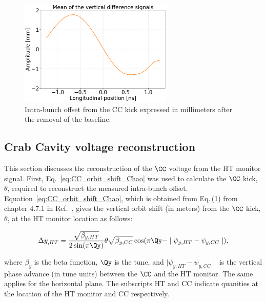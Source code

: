 \begin{figure}[!h]
   \centering         
   \includegraphics[width=0.65\textwidth]{images/Ch4/HT_corrected__20180530_135105_baseline_correction_new_version_CC_post_processing.png}
       \caption{Intra-bunch offset from the CC kick expressed in millimeters after the removal of the baseline.}
       \label{fig:HT_baseline_correction_crabbing_mm}
\end{figure}


 \subsection{Crab Cavity voltage reconstruction}\label{sec:Vcc_calibration}
 This section discusses the reconstruction of the $\CC$ voltage from the HT monitor signal. First, Eq.~\eqref{eq:CC_orbit_shift_Chao} was used to calculate the $\CC$ kick, $\theta$, required to reconstruct the measured intra-bunch offset. Equation~\eqref{eq:CC_orbit_shift_Chao}, which is obtained from Eq.\,(1) from chapter 4.7.1 in Ref.~\cite{Chao:1490001}, gives the vertical orbit shift (in meters) from the $\CC$ kick, $\theta$, at the HT monitor location as follows:

\begin{equation}\label{eq:CC_orbit_shift_Chao}
   \Delta y_{,HT} = \frac{\sqrt{\beta_{y, HT}}}{2 \sin(\pi \Qy)} \theta \sqrt{\beta_{y, CC}} \cos(\pi \Qy - \mid \psi_{y, HT} - \psi_{y, CC} \mid),
\end{equation}

where $\beta_y$ is the beta function, $\Qy$ is the tune, and $\mid \psi_{y, HT} - \psi_{y, CC} \mid$ is the vertical phase advance (in tune units) between the $\CC$ and the HT monitor. The same applies for the horizontal plane. The subscripts HT and CC indicate quanities at the location of the HT monitor and CC respectively.


